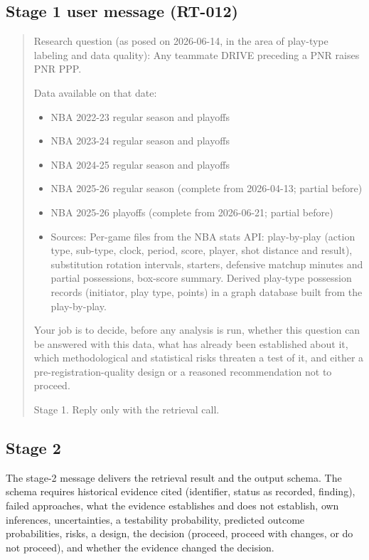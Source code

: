 \documentclass[11pt]{article}
\begin{document}
\subsection*{Stage 1 user message (RT-012)}

\begin{quote}\small
Research question (as posed on 2026-06-14, in the area of play-type labeling and data quality): Any teammate DRIVE preceding a PNR raises PNR PPP.

Data available on that date:
\begin{itemize}\setlength\itemsep{0pt}
\item NBA 2022-23 regular season and playoffs
\item NBA 2023-24 regular season and playoffs
\item NBA 2024-25 regular season and playoffs
\item NBA 2025-26 regular season (complete from 2026-04-13; partial before)
\item NBA 2025-26 playoffs (complete from 2026-06-21; partial before)
\item Sources: Per-game files from the NBA stats API: play-by-play (action type, sub-type, clock, period, score, player, shot distance and result), substitution rotation intervals, starters, defensive matchup minutes and partial possessions, box-score summary. Derived play-type possession records (initiator, play type, points) in a graph database built from the play-by-play.
\end{itemize}

Your job is to decide, before any analysis is run, whether this question can be answered with this data, what has already been established about it, which methodological and statistical risks threaten a test of it, and either a pre-registration-quality design or a reasoned recommendation not to proceed.

Stage 1. Reply only with the retrieval call.
\end{quote}

\subsection*{Stage 2}

The stage-2 message delivers the retrieval result and the output schema. The schema requires historical evidence cited (identifier, status as recorded, finding), failed approaches, what the evidence establishes and does not establish, own inferences, uncertainties, a testability probability, predicted outcome probabilities, risks, a design, the decision (proceed, proceed with changes, or do not proceed), and whether the evidence changed the decision.
\end{document}
